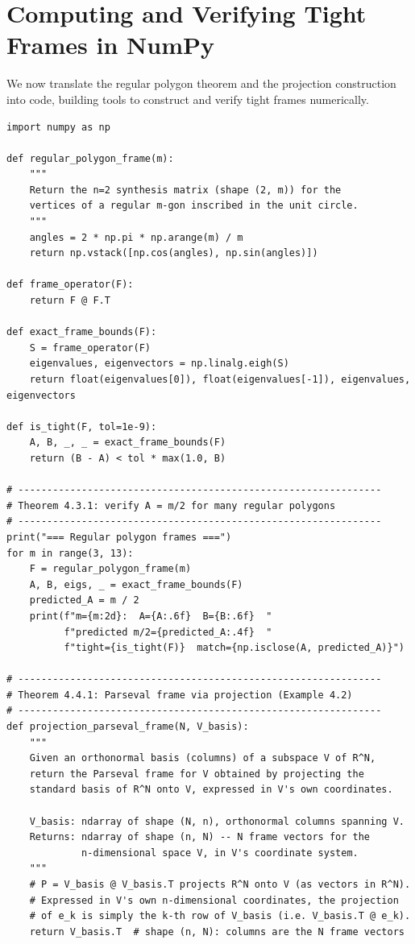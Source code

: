 \section{Computing and Verifying Tight Frames in NumPy}
\label{sec:numpy-tight-frames}

We now translate the regular polygon theorem and the projection
construction into code, building tools to construct and verify tight
frames numerically.

\begin{lstlisting}[caption={Regular polygon frames and the projection construction}]
import numpy as np

def regular_polygon_frame(m):
    """
    Return the n=2 synthesis matrix (shape (2, m)) for the
    vertices of a regular m-gon inscribed in the unit circle.
    """
    angles = 2 * np.pi * np.arange(m) / m
    return np.vstack([np.cos(angles), np.sin(angles)])

def frame_operator(F):
    return F @ F.T

def exact_frame_bounds(F):
    S = frame_operator(F)
    eigenvalues, eigenvectors = np.linalg.eigh(S)
    return float(eigenvalues[0]), float(eigenvalues[-1]), eigenvalues, eigenvectors

def is_tight(F, tol=1e-9):
    A, B, _, _ = exact_frame_bounds(F)
    return (B - A) < tol * max(1.0, B)

# ---------------------------------------------------------------
# Theorem 4.3.1: verify A = m/2 for many regular polygons
# ---------------------------------------------------------------
print("=== Regular polygon frames ===")
for m in range(3, 13):
    F = regular_polygon_frame(m)
    A, B, eigs, _ = exact_frame_bounds(F)
    predicted_A = m / 2
    print(f"m={m:2d}:  A={A:.6f}  B={B:.6f}  "
          f"predicted m/2={predicted_A:.4f}  "
          f"tight={is_tight(F)}  match={np.isclose(A, predicted_A)}")

# ---------------------------------------------------------------
# Theorem 4.4.1: Parseval frame via projection (Example 4.2)
# ---------------------------------------------------------------
def projection_parseval_frame(N, V_basis):
    """
    Given an orthonormal basis (columns) of a subspace V of R^N,
    return the Parseval frame for V obtained by projecting the
    standard basis of R^N onto V, expressed in V's own coordinates.

    V_basis: ndarray of shape (N, n), orthonormal columns spanning V.
    Returns: ndarray of shape (n, N) -- N frame vectors for the
             n-dimensional space V, in V's coordinate system.
    """
    # P = V_basis @ V_basis.T projects R^N onto V (as vectors in R^N).
    # Expressed in V's own n-dimensional coordinates, the projection
    # of e_k is simply the k-th row of V_basis (i.e. V_basis.T @ e_k).
    return V_basis.T  # shape (n, N): columns are the N frame vectors


\end{lstlisting}
